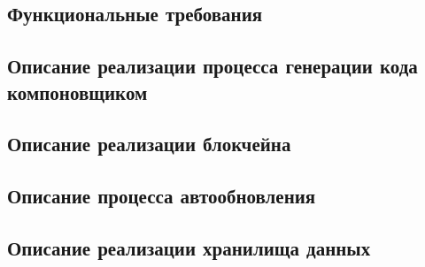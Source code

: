 \subsection{Функциональные требования}


\subsection{Описание реализации процесса генерации кода компоновщиком}\label{komponovshik}


\subsection{Описание реализации блокчейна}


\subsection{Описание процесса автообновления}
\label{autoobnova}

\subsection{Описание реализации хранилища данных}\label{shron}

